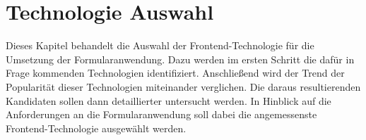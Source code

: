 \section{Technologie Auswahl}

Dieses Kapitel behandelt die Auswahl der Frontend-Technologie für die Umsetzung der Formularanwendung.
Dazu  werden im ersten Schritt die dafür in Frage kommenden Technologien identifiziert.
 Anschließend wird der Trend der Popularität dieser Technologien miteinander verglichen.
Die daraus resultierenden Kandidaten sollen dann  detaillierter untersucht werden.
In Hinblick auf die Anforderungen an die Formularanwendung soll dabei die angemessenste Frontend-Technologie ausgewählt werden.



